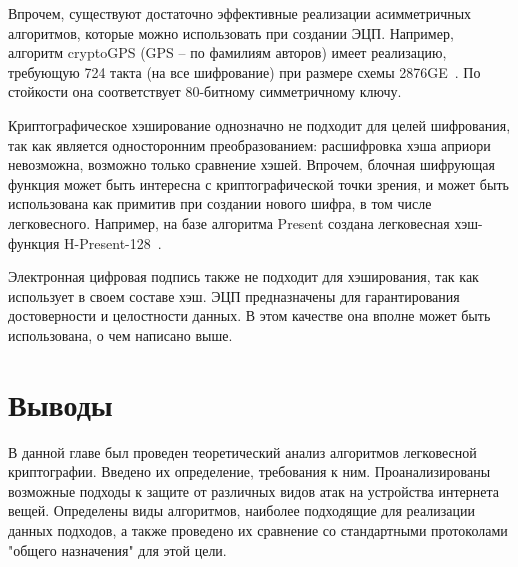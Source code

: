 Впрочем, существуют достаточно эффективные реализации асимметричных алгоритмов, которые можно использовать при создании ЭЦП. Например, алгоритм cryptoGPS (GPS – по фамилиям авторов) имеет реализацию, требующую 724 такта (на все шифрование) при размере схемы 2876GE~\cite{src51}. По стойкости она соответствует 80-битному симметричному ключу.

Криптографическое хэширование однозначно не подходит для целей шифрования, так как является односторонним преобразованием: расшифровка хэша априори невозможна, возможно только сравнение хэшей. Впрочем, блочная шифрующая функция может быть интересна с криптографической точки зрения, и может быть использована как примитив при создании нового шифра, в том числе легковесного. Например, на базе алгоритма Present создана легковесная хэш-функция H-Present-128~\cite{src52}.

Электронная цифровая подпись также не подходит для хэширования, так как использует в своем составе хэш. ЭЦП предназначены для гарантирования достоверности и целостности данных. В этом качестве она вполне может быть использована, о чем написано выше.

\section{Выводы} \label{ch2:conclusion}

В данной главе был проведен теоретический анализ алгоритмов легковесной криптографии. Введено их определение, требования к ним. Проанализированы возможные подходы к защите от различных видов атак на устройства интернета вещей. Определены виды алгоритмов, наиболее подходящие для реализации данных подходов, а также проведено их сравнение со стандартными протоколами "общего назначения" для этой цели.

\newpage

%
